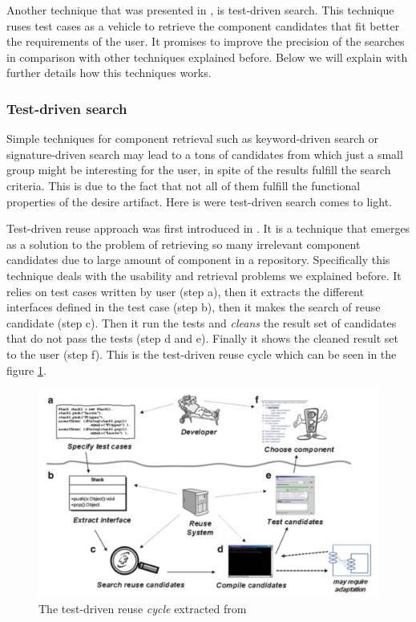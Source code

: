 Another technique that was presented in \cite{Hummel2004}, is test-driven search. This technique ruses test cases as a vehicle to retrieve the component candidates that fit better the requirements of the user. It promises to improve the precision of the searches in comparison with other techniques explained before. Below we will explain with further details how this techniques works. 

\subsubsection{Test-driven search}
Simple techniques for component retrieval such as keyword-driven search or signature-driven search may lead to a tons of candidates from which just a small group might be interesting for the user, in spite of the results fulfill the search criteria. This is due to the fact that not all of them fulfill the functional properties of the desire artifact. Here is were test-driven search comes to light. 

Test-driven reuse approach was first introduced in \cite{Hummel2004}. It is a technique that emerges as a solution to the problem of retrieving so many irrelevant component candidates due to large amount of component in a repository. Specifically this technique deals with the usability and retrieval problems we explained before. It relies on test cases written by user (step a), then it extracts the different interfaces defined in the test case (step b), then it makes the search of reuse candidate (step c). Then it run the tests and \textit{cleans} the result set of candidates that do not pass the tests (step d and e). Finally it shows the cleaned result set to the user (step f). This is the test-driven reuse cycle which can be seen in the figure \ref{fig:test-driven-cycle}.

\begin{figure}[ht]
	\centering
    \includegraphics[width=\textwidth]{grafiken/test-driven-cycle}
    \caption{The test-driven reuse \textit{cycle} extracted from \citep{Hummel2013}}
    \label{fig:test-driven-cycle}
\end{figure}

